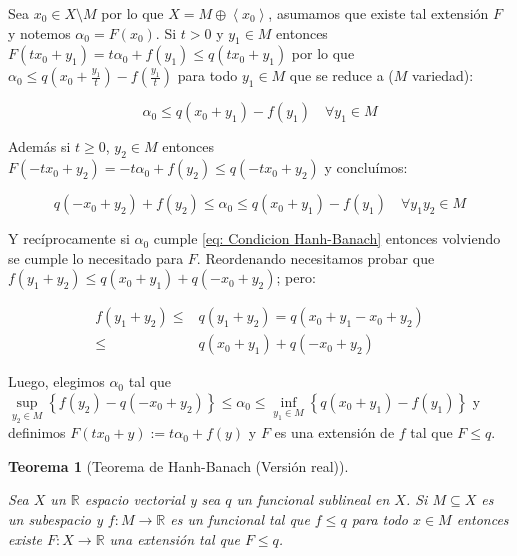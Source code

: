 \documentclass[11pt]{article}
\newcommand{\R}{{\mathbb{R}}}
\newcommand{\ip}[1]{\left\langle#1\right\rangle}
\newcommand{\sett}[1]{\left\lbrace#1\right\rbrace}
\newtheorem{theorem}{Teorema}
\numberwithin{theorem}{subsection}
\newenvironment{proof}[1][Demostraci\'on]{\begin{trivlist}
		\item[\hskip \labelsep {\bfseries #1}]}{\end{trivlist}}
\newcommand{\qed}{\nobreak \ifvmode \relax \else
	\ifdim\lastskip<1.5em \hskip-\lastskip
	\hskip1.5em plus0em minus0.5em \fi \nobreak
	\vrule height0.75em width0.5em depth0.25em\fi}
\begin{document}
\begin{proof}
	Sea $x_0 \in X \setminus M$ por lo que $X = M \oplus \ip{x_0}$, asumamos que existe tal extensi\'on $F$ y notemos $\alpha_0 = F(x_0)$. Si $t > 0$ y $y_1 \in M$ entonces $F(tx_0 + y_1) = t\alpha_0 + f(y_1) \leq q(tx_0 + y_1)$ por lo que $\alpha_0 \leq q(x_0 + \frac{y_1}{t}) - f(\frac{y_1}{t})$ para todo $y_1 \in M$ que se reduce a ($M$ variedad):
	
	\begin{equation*}
		\alpha_0 \leq q(x_0 + y_1) - f(y_1) \quad \forall y_1 \in M
	\end{equation*}
	
	Adem\'as si $t \geq 0$, $y_2 \in M$ entonces $F(-tx_0 + y_2) = -t\alpha_0 + f(y_2) \leq q(-tx_0 + y_2)$ y conclu\'imos:
	
	\begin{equation}
	\label{eq: Condicion Hanh-Banach}
		q(-x_0 + y_2) + f(y_2)  \leq \alpha_0 \leq q(x_0 + y_1) - f(y_1) \quad \forall y_1y_2 \in M
	\end{equation}
	
	Y rec\'iprocamente si $\alpha_0$ cumple \ref{eq: Condicion Hanh-Banach} entonces volviendo se cumple lo necesitado para $F$. Reordenando necesitamos probar que $f(y_1 + y_2) \leq q(x_0 + y_1) + q(-x_0 + y_2)$; pero:
	
	\begin{equation*}
	\begin{aligned}
		f(y_1 + y_2) \leq & q(y_1 + y_2) = q(x_0 + y_1 -x_0 + y_2) \\
		\leq & q(x_0 + y_1) + q(-x_0 + y_2)
	\end{aligned}
	\end{equation*}
	
	Luego, elegimos $\alpha_0$ tal que $\sup\limits_{y_2 \in M}\sett{f(y_2) - q(-x_0 + y_2)} \leq \alpha_0 \leq \inf\limits_{y_1 \in M}\sett{q(x_0 + y_1) - f(y_1)}$ y definimos $F(tx_0 + y) := t \alpha_0 + f(y)$ y $F$ es una extensi\'on de $f$ tal que $F \leq q$. \qed
	
\end{proof}

\begin{theorem}[Teorema de Hanh-Banach (Versi\'on real)]
	\label{Hanh-Banach real}

	Sea $X$ un $\R$ espacio vectorial y sea $q$ un funcional sublineal en $X$. Si $M \subseteq X$ es un subespacio y $f : M \rightarrow \R$ es un funcional tal que $f \leq q$ para todo $x \in M$ entonces existe $F : X \rightarrow \R$ una extensi\'on tal que $F \leq q$.
\end{theorem}
\end{document}
